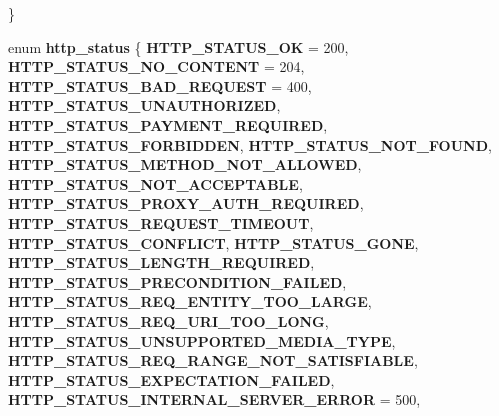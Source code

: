 \begin{DoxyCompactItemize}
 \}
\item 
\mbox{\label{group__http_gabc3b93f68c8bdd857ad32913628dfa8d}} 
enum {\bfseries http\+\_\+status} \{ \newline
{\bfseries H\+T\+T\+P\+\_\+\+S\+T\+A\+T\+U\+S\+\_\+\+OK} = 200, 
{\bfseries H\+T\+T\+P\+\_\+\+S\+T\+A\+T\+U\+S\+\_\+\+N\+O\+\_\+\+C\+O\+N\+T\+E\+NT} = 204, 
{\bfseries H\+T\+T\+P\+\_\+\+S\+T\+A\+T\+U\+S\+\_\+\+B\+A\+D\+\_\+\+R\+E\+Q\+U\+E\+ST} = 400, 
{\bfseries H\+T\+T\+P\+\_\+\+S\+T\+A\+T\+U\+S\+\_\+\+U\+N\+A\+U\+T\+H\+O\+R\+I\+Z\+ED}, 
\newline
{\bfseries H\+T\+T\+P\+\_\+\+S\+T\+A\+T\+U\+S\+\_\+\+P\+A\+Y\+M\+E\+N\+T\+\_\+\+R\+E\+Q\+U\+I\+R\+ED}, 
{\bfseries H\+T\+T\+P\+\_\+\+S\+T\+A\+T\+U\+S\+\_\+\+F\+O\+R\+B\+I\+D\+D\+EN}, 
{\bfseries H\+T\+T\+P\+\_\+\+S\+T\+A\+T\+U\+S\+\_\+\+N\+O\+T\+\_\+\+F\+O\+U\+ND}, 
{\bfseries H\+T\+T\+P\+\_\+\+S\+T\+A\+T\+U\+S\+\_\+\+M\+E\+T\+H\+O\+D\+\_\+\+N\+O\+T\+\_\+\+A\+L\+L\+O\+W\+ED}, 
\newline
{\bfseries H\+T\+T\+P\+\_\+\+S\+T\+A\+T\+U\+S\+\_\+\+N\+O\+T\+\_\+\+A\+C\+C\+E\+P\+T\+A\+B\+LE}, 
{\bfseries H\+T\+T\+P\+\_\+\+S\+T\+A\+T\+U\+S\+\_\+\+P\+R\+O\+X\+Y\+\_\+\+A\+U\+T\+H\+\_\+\+R\+E\+Q\+U\+I\+R\+ED}, 
{\bfseries H\+T\+T\+P\+\_\+\+S\+T\+A\+T\+U\+S\+\_\+\+R\+E\+Q\+U\+E\+S\+T\+\_\+\+T\+I\+M\+E\+O\+UT}, 
{\bfseries H\+T\+T\+P\+\_\+\+S\+T\+A\+T\+U\+S\+\_\+\+C\+O\+N\+F\+L\+I\+CT}, 
\newline
{\bfseries H\+T\+T\+P\+\_\+\+S\+T\+A\+T\+U\+S\+\_\+\+G\+O\+NE}, 
{\bfseries H\+T\+T\+P\+\_\+\+S\+T\+A\+T\+U\+S\+\_\+\+L\+E\+N\+G\+T\+H\+\_\+\+R\+E\+Q\+U\+I\+R\+ED}, 
{\bfseries H\+T\+T\+P\+\_\+\+S\+T\+A\+T\+U\+S\+\_\+\+P\+R\+E\+C\+O\+N\+D\+I\+T\+I\+O\+N\+\_\+\+F\+A\+I\+L\+ED}, 
{\bfseries H\+T\+T\+P\+\_\+\+S\+T\+A\+T\+U\+S\+\_\+\+R\+E\+Q\+\_\+\+E\+N\+T\+I\+T\+Y\+\_\+\+T\+O\+O\+\_\+\+L\+A\+R\+GE}, 
\newline
{\bfseries H\+T\+T\+P\+\_\+\+S\+T\+A\+T\+U\+S\+\_\+\+R\+E\+Q\+\_\+\+U\+R\+I\+\_\+\+T\+O\+O\+\_\+\+L\+O\+NG}, 
{\bfseries H\+T\+T\+P\+\_\+\+S\+T\+A\+T\+U\+S\+\_\+\+U\+N\+S\+U\+P\+P\+O\+R\+T\+E\+D\+\_\+\+M\+E\+D\+I\+A\+\_\+\+T\+Y\+PE}, 
{\bfseries H\+T\+T\+P\+\_\+\+S\+T\+A\+T\+U\+S\+\_\+\+R\+E\+Q\+\_\+\+R\+A\+N\+G\+E\+\_\+\+N\+O\+T\+\_\+\+S\+A\+T\+I\+S\+F\+I\+A\+B\+LE}, 
{\bfseries H\+T\+T\+P\+\_\+\+S\+T\+A\+T\+U\+S\+\_\+\+E\+X\+P\+E\+C\+T\+A\+T\+I\+O\+N\+\_\+\+F\+A\+I\+L\+ED}, 
\newline
{\bfseries H\+T\+T\+P\+\_\+\+S\+T\+A\+T\+U\+S\+\_\+\+I\+N\+T\+E\+R\+N\+A\+L\+\_\+\+S\+E\+R\+V\+E\+R\+\_\+\+E\+R\+R\+OR} = 500, 

\end{DoxyCompactItemize}

